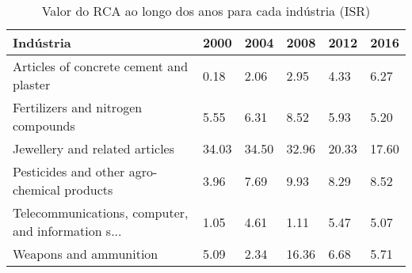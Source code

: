 \begin{table}
\centering
\caption{Valor do RCA ao longo dos anos para cada indústria (ISR)}
\label{tab:ex3-tempo-ISR}
\begin{tabular}{p{6cm}p{1.5cm}p{1.5cm}p{1.5cm}p{1.5cm}p{1.5cm}}
\toprule
                                         Indústria &  2000 &  2004 &  2008 &  2012 &  2016 \\
\midrule
           Articles of concrete cement and plaster &  0.18 &  2.06 &  2.95 &  4.33 &  6.27 \\
                Fertilizers and nitrogen compounds &  5.55 &  6.31 &  8.52 &  5.93 &  5.20 \\
                    Jewellery and related articles & 34.03 & 34.50 & 32.96 & 20.33 & 17.60 \\
       Pesticides and other agro-chemical products &  3.96 &  7.69 &  9.93 &  8.29 &  8.52 \\
Telecommunications, computer, and information s... &  1.05 &  4.61 &  1.11 &  5.47 &  5.07 \\
                            Weapons and ammunition &  5.09 &  2.34 & 16.36 &  6.68 &  5.71 \\
\bottomrule
\end{tabular}
\end{table}
